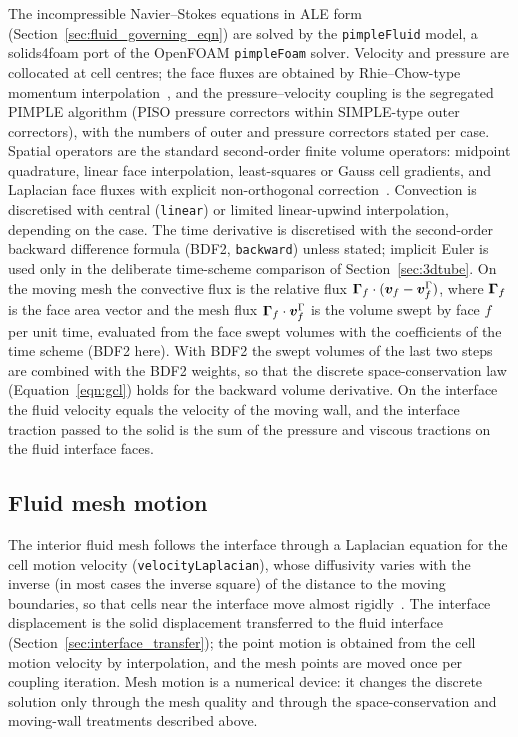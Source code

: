 The incompressible Navier--Stokes equations in ALE form (Section~\ref{sec:fluid_governing_eqn}) are solved by the \texttt{pimpleFluid} model, a solids4foam port of the OpenFOAM \texttt{pimpleFoam} solver.
Velocity and pressure are collocated at cell centres; the face fluxes are obtained by Rhie--Chow-type momentum interpolation~\citep{Rhie1983}, and the pressure--velocity coupling is the segregated PIMPLE algorithm (PISO pressure correctors within SIMPLE-type outer correctors), with the numbers of outer and pressure correctors stated per case.
Spatial operators are the standard second-order finite volume operators: midpoint quadrature, linear face interpolation, least-squares or Gauss cell gradients, and Laplacian face fluxes with explicit non-orthogonal correction~\citep{Jasak1996}.
Convection is discretised with central (\texttt{linear}) or limited linear-upwind interpolation, depending on the case.
The time derivative is discretised with the second-order backward difference formula (BDF2, \texttt{backward}) unless stated; implicit Euler is used only in the deliberate time-scheme comparison of Section~\ref{sec:3dtube}.
On the moving mesh the convective flux is the relative flux $\boldsymbol{\Gamma}_f\cdot(\boldsymbol{v}_f - \boldsymbol{v}^\Gamma_f)$, where $\boldsymbol{\Gamma}_f$ is the face area vector and the mesh flux $\boldsymbol{\Gamma}_f\cdot\boldsymbol{v}^\Gamma_f$ is the volume swept by face $f$ per unit time, evaluated from the face swept volumes with the coefficients of the time scheme (BDF2 here).
With BDF2 the swept volumes of the last two steps are combined with the BDF2 weights, so that the discrete space-conservation law (Equation~\eqref{eqn:gcl}) holds for the backward volume derivative.
On the interface the fluid velocity equals the velocity of the moving wall, and the interface traction passed to the solid is the sum of the pressure and viscous tractions on the fluid interface faces.

\subsection{Fluid mesh motion}\label{sec:fluid_mesh_motion}

The interior fluid mesh follows the interface through a Laplacian equation for the cell motion velocity (\texttt{velocityLaplacian}), whose diffusivity varies with the inverse (in most cases the inverse square) of the distance to the moving boundaries, so that cells near the interface move almost rigidly~\citep{Tukovic2018}.
The interface displacement is the solid displacement transferred to the fluid interface (Section~\ref{sec:interface_transfer}); the point motion is obtained from the cell motion velocity by interpolation, and the mesh points are moved once per coupling iteration.
Mesh motion is a numerical device: it changes the discrete solution only through the mesh quality and through the space-conservation and moving-wall treatments described above.


